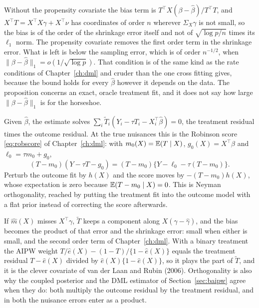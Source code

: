 Without the propensity covariate the bias term is $T^\top X(\beta - \hat\beta)/T^\top T$, and $X^\top T = X^\top X\gamma + X^\top\nu$ has coordinates of order $n$ wherever $\Sigma_X\gamma$ is not small, so the bias is of the order of the shrinkage error itself and not of $\sqrt{\log p/n}$ times its $\ell_1$ norm. The propensity covariate removes the first order term in the shrinkage error. What is left is below the sampling error, which is of order $n^{-1/2}$, when $\|\beta - \hat\beta\|_1 = o(1/\sqrt{\log p})$. That condition is of the same kind as the rate conditions of Chapter~\ref{ch:dml} and cruder than the one cross fitting gives, because the bound holds for every $\hat\beta$ however it depends on the data. The proposition concerns an exact, oracle treatment fit, and it does not say how large $\|\beta - \hat\beta\|_1$ is for the horseshoe.

 Given $\hat\beta$, the estimate solves $\sum_i\tilde T_i(Y_i - \tau T_i - X_i^\top\hat\beta) = 0$, the treatment residual times the outcome residual. At the true nuisances this is the Robinson score \eqref{eq:robscore} of Chapter~\ref{ch:dml}: with $m_0(X) = \mathbb{E}(T \mid X)$, $g_0(X) = X^\top\beta$ and $\ell_0 = \tau m_0 + g_0$,
\[
(T - m_0)(Y - \tau T - g_0) = (T - m_0)\{Y - \ell_0 - \tau(T - m_0)\}.
\]
Perturb the outcome fit by $h(X)$ and the score moves by $-(T - m_0)h(X)$, whose expectation is zero because $\mathbb{E}(T - m_0 \mid X) = 0$. This is Neyman orthogonality, reached by putting the treatment fit into the outcome model with a flat prior instead of correcting the score afterwards.

If $\hat m(X)$ misses $X^\top\gamma$, $\tilde T$ keeps a component along $X(\gamma - \hat\gamma)$, and the bias becomes the product of that error and the shrinkage error: small when either is small, and the second order term of Chapter~\ref{ch:dml}. With a binary treatment the AIPW weight $T/\hat e(X) - (1 - T)/\{1 - \hat e(X)\}$ equals the treatment residual $T - \hat e(X)$ divided by $\hat e(X)\{1 - \hat e(X)\}$, so it plays the part of $\tilde T$, and it is the clever covariate of van der Laan and Rubin (2006). Orthogonality is also why the coupled posterior and the DML estimator of Section~\ref{sec:baipw} agree when they do: both multiply the outcome residual by the treatment residual, and in both the nuisance errors enter as a product.

